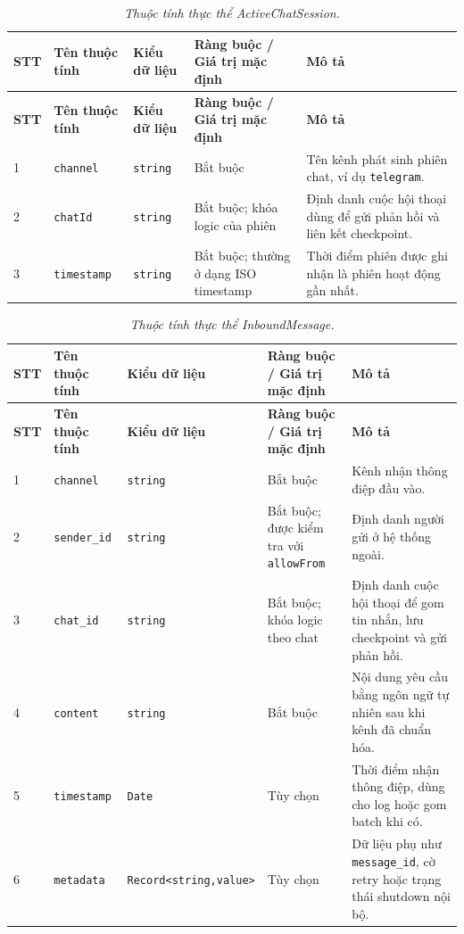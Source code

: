 \begin{longtable}{|p{0.55cm}|p{2.55cm}|p{2.7cm}|p{3.25cm}|p{4.0cm}|}
\caption{\emph{Thuộc tính thực thể ActiveChatSession.}}\label{tab:erd-active-chat-session}\\
\hline
\textbf{STT} & \textbf{Tên thuộc tính} & \textbf{Kiểu dữ liệu} & \textbf{Ràng buộc / Giá trị mặc định} & \textbf{Mô tả} \\
\hline
\endfirsthead
\hline
\textbf{STT} & \textbf{Tên thuộc tính} & \textbf{Kiểu dữ liệu} & \textbf{Ràng buộc / Giá trị mặc định} & \textbf{Mô tả} \\
\hline
\endhead
1 & \texttt{channel} & \texttt{string} & Bắt buộc & Tên kênh phát sinh phiên chat, ví dụ \texttt{telegram}. \\
\hline
2 & \texttt{chatId} & \texttt{string} & Bắt buộc; khóa logic của phiên & Định danh cuộc hội thoại dùng để gửi phản hồi và liên kết checkpoint. \\
\hline
3 & \texttt{timestamp} & \texttt{string} & Bắt buộc; thường ở dạng ISO timestamp & Thời điểm phiên được ghi nhận là phiên hoạt động gần nhất. \\
\hline
\end{longtable}

\begin{longtable}{|p{0.55cm}|p{2.55cm}|p{2.7cm}|p{3.25cm}|p{4.0cm}|}
\caption{\emph{Thuộc tính thực thể InboundMessage.}}\label{tab:erd-inbound-message}\\
\hline
\textbf{STT} & \textbf{Tên thuộc tính} & \textbf{Kiểu dữ liệu} & \textbf{Ràng buộc / Giá trị mặc định} & \textbf{Mô tả} \\
\hline
\endfirsthead
\hline
\textbf{STT} & \textbf{Tên thuộc tính} & \textbf{Kiểu dữ liệu} & \textbf{Ràng buộc / Giá trị mặc định} & \textbf{Mô tả} \\
\hline
\endhead
1 & \texttt{channel} & \texttt{string} & Bắt buộc & Kênh nhận thông điệp đầu vào. \\
\hline
2 & \texttt{sender\_id} & \texttt{string} & Bắt buộc; được kiểm tra với \texttt{allowFrom} & Định danh người gửi ở hệ thống ngoài. \\
\hline
3 & \texttt{chat\_id} & \texttt{string} & Bắt buộc; khóa logic theo chat & Định danh cuộc hội thoại để gom tin nhắn, lưu checkpoint và gửi phản hồi. \\
\hline
4 & \texttt{content} & \texttt{string} & Bắt buộc & Nội dung yêu cầu bằng ngôn ngữ tự nhiên sau khi kênh đã chuẩn hóa. \\
\hline
5 & \texttt{timestamp} & \texttt{Date} & Tùy chọn & Thời điểm nhận thông điệp, dùng cho log hoặc gom batch khi có. \\
\hline
6 & \texttt{metadata} & \texttt{Record<string,}\newline\texttt{value>} & Tùy chọn & Dữ liệu phụ như \texttt{message\_id}, cờ retry hoặc trạng thái shutdown nội bộ. \\
\hline
\end{longtable}

